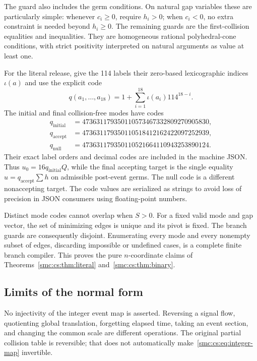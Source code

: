 \documentclass[11pt,letterpaper]{article}
\numberwithin{equation}{section}
\theoremstyle{definition}
\theoremstyle{remark}
\begin{document}
The guard also includes the germ conditions. On natural gap variables these are particularly simple: whenever $c_i\ge0$, require $h_i>0$; when $c_i<0$, no extra constraint is needed beyond $h_i\ge0$. The remaining guards are the first-collision equalities and inequalities. They are homogeneous rational polyhedral-cone conditions, with strict positivity interpreted on natural arguments as value at least one.

For the literal release, give the 114 labels their zero-based lexicographic indices $\iota(a)$ and use the explicit code
\[
 q(a_1,\ldots,a_{18})=1+\sum_{i=1}^{18}\iota(a_i)114^{18-i}.
\]
The initial and final collision-free modes have codes
\begin{align*}
 q_{\mathrm{initial}}&=473631179350110573467332809270905830,\\
 q_{\mathrm{accept}}&=473631179350110518412162422097252939,\\
 q_{\mathrm{null}}&=473631179350110521664110943253890124.
\end{align*}
Their exact label orders and decimal codes are included in the machine JSON. Thus $u_0=16q_{\mathrm{initial}}Q$, while the final accepting target is the single equality $u=q_{\mathrm{accept}}\sum h$ on admissible post-event germs. The null code is a different nonaccepting target. The code values are serialized as strings to avoid loss of precision in JSON consumers using floating-point numbers.

Distinct mode codes cannot overlap when $S>0$. For a fixed valid mode and gap vector, the set of minimizing edges is unique and its pivot is fixed. The branch guards are consequently disjoint. Enumerating every mode and every nonempty subset of edges, discarding impossible or undefined cases, is a complete finite branch compiler. This proves the pure $n$-coordinate claims of Theorems~\ref{smc:cs:thm:literal} and~\ref{smc:cs:thm:binary}.

\subsection{Limits of the normal form}
No injectivity of the integer event map is asserted. Reversing a signal flow, quotienting global translation, forgetting elapsed time, taking an event section, and changing the common scale are different operations. The original partial collision table is reversible; that does not automatically make~\eqref{smc:cs:eq:integer-map} invertible.
\end{document}
